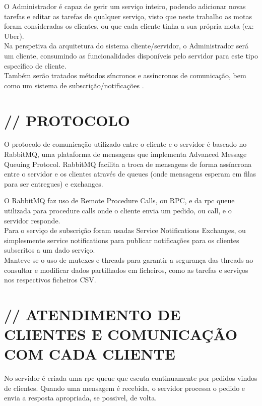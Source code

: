 \documentclass[12pt]{article}
\begin{document}
\noindent O Administrador é capaz de gerir um serviço inteiro, podendo adicionar novas tarefas e editar as tarefas de qualquer serviço, visto que neste trabalho as motas foram consideradas os clientes, ou que cada cliente tinha a sua própria mota (ex: Uber).\\

\noindent Na perspetiva da arquitetura do sistema cliente/servidor, o Administrador será um cliente, consumindo as funcionalidades disponíveis pelo servidor para este tipo específico de cliente.\\

\noindent Também serão tratados métodos síncronos e assíncronos de comunicação, bem como um sistema de subscrição/notificações .

\section{// PROTOCOLO}
O protocolo de comunicação utilizado entre o cliente e o servidor é baseado no RabbitMQ, uma plataforma de mensagens que implementa Advanced Message Queuing Protocol. RabbitMQ facilita a troca de mensagens de forma assíncrona entre o servidor e os clientes através de queues (onde mensagens esperam em filas para ser entregues) e exchanges.

\noindent O RabbitMQ faz uso de Remote Procedure Calls, ou RPC, e da rpc queue utilizada para procedure calls onde o cliente envia um pedido, ou call, e o servidor responde.\\

\noindent Para o serviço de subscrição foram usadas Service Notifications Exchanges, ou simplesmente service notifications para publicar notificações para os clientes subscritos a um dado serviço.\\

\noindent Manteve-se o uso de mutexes e threads para garantir a segurança das threads ao consultar e modificar dados partilhados em ficheiros, como as tarefas e serviços nos respectivos ficheiros CSV.

\section{// ATENDIMENTO DE CLIENTES E COMUNICAÇÃO COM CADA CLIENTE}

No servidor é criada uma rpc queue que escuta continuamente por pedidos vindos de clientes. Quando uma mensagem é recebida, o servidor processa o pedido e envia a resposta apropriada, se possivel, de volta.\\
\end{document}
